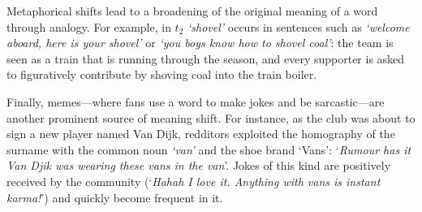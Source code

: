 Metaphorical shifts lead to a broadening of the original meaning of a
word through analogy.
For example, in $t_2$ {\em `shovel'} occurs in sentences such as \textit{`welcome aboard, here is your shovel'} or 
\textit{`you boys know how to shovel coal'}: the team is seen as a train that is running through the season, and every supporter is asked to figuratively contribute by shoving coal into the train boiler. 

Finally, memes---where fans use a word to make jokes and be
sarcastic---are another prominent source of meaning shift. For
instance, as the club was about to sign a new player named Van Dijk,
redditors exploited the homography of the surname with the common noun
{\em `van'} and the shoe brand `Vans': `\textit{Rumour has it Van Djik
  was wearing these vans in the van}'. Jokes of this kind are
positively received by the community (`\textit{Hahah I love
  it. Anything with vans is instant karma!}') and quickly become
frequent in it.





